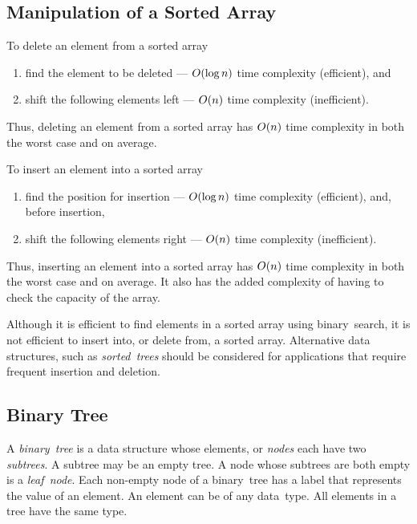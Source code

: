\subsection{Manipulation of a Sorted Array}

To delete an element from a sorted array
\begin{enumerate}
  \item find the element to be deleted --- \( O\!\left(\log n\right) \) time complexity (efficient), and
  \item shift the following elements left --- \( O\!\left(n\right) \) time complexity (inefficient).
\end{enumerate}
Thus, deleting an element from a sorted array has \( O\!\left(n\right) \) time complexity in both the worst case and on average.

To insert an element into a sorted array
\begin{enumerate}
  \item find the position for insertion --- \( O\!\left(\log n\right) \) time complexity (efficient), and, before insertion,
  \item shift the following elements right --- \( O\!\left(n\right) \) time complexity (inefficient).
\end{enumerate}
Thus, inserting an element into a sorted array has \( O\!\left(n\right) \) time complexity in both the worst case and on average.
It also has the added complexity of having to check the capacity of the array.

Although it is efficient to find elements in a sorted array using binary~search, it is not efficient to insert into, or delete from, a sorted array.
Alternative data structures, such as \emph{sorted~trees} should be considered for applications that require frequent insertion and deletion.

\subsection{Binary Tree}

A \emph{binary~tree} is a data structure whose elements, or \emph{nodes} each have two \emph{subtrees}.
A subtree may be an empty tree.
A node whose subtrees are both empty is a \emph{leaf~node}.
Each non-empty node of a binary~tree has a label that represents the value of an element.
An element can be of any data~type.
All elements in a tree have the same type.

